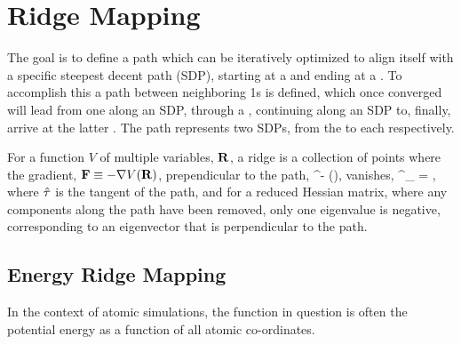 \section{Ridge Mapping}
The goal is to define a path which can be iteratively optimized to align itself with a specific steepest decent path (SDP),
starting at a  and ending at a .
To accomplish this a path between neighboring \sap1s is defined,
which once converged will lead from one  along an SDP,
through a ,
continuing along an SDP to, finally, arrive at the latter .
The path represents two SDPs, from the  to each  respectively.

For a function $V$ of multiple variables, $\mathbf{R}$, a ridge is a collection of points where the gradient, $\mathbf{F} \equiv -\nabla V(\mathbf{R})$, prependicular to the path,
\beq
\vF^\perp \equiv \vF - (\vF \cdot \uvt)\uvt,
\eeq
vanishes,
\beq
\vF^\perp_ = ,
\eeq
where $\hat{\mathbf{\tau}}$ is the tangent of the path,
and for a reduced Hessian matrix, where any components along the path have been removed, only one eigenvalue is negative, corresponding to an eigenvector that is perpendicular to the path.




\incomplete




\subsection{Energy Ridge Mapping}
In the context of atomic simulations, the function in question is often the potential energy as a function of all atomic co-ordinates.





\incomplete



